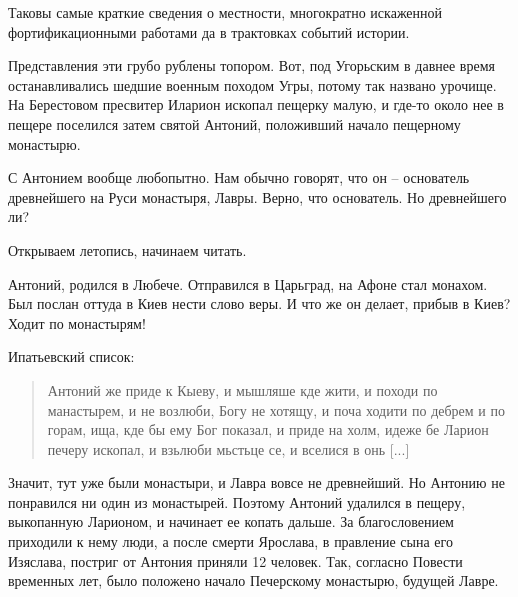 Таковы самые краткие сведения о местности, многократно искаженной фортификационными работами да в трактовках событий истории.

Представления эти грубо рублены топором. Вот, под Угорьским в давнее время останавливались шедшие военным походом Угры, потому так названо урочище. На Берестовом пресвитер Иларион ископал пещерку малую, и где-то около нее в пещере поселился затем святой Антоний, положивший начало пещерному монастырю. 

С Антонием вообще любопытно. Нам обычно говорят, что он – основатель древнейшего на Руси монастыря, Лавры. Верно, что основатель. Но древнейшего ли? 

Открываем летопись, начинаем читать.

Антоний, родился в Любече. Отправился в Царьград, на Афоне стал монахом. Был послан оттуда в Киев нести слово веры. И что же он делает, прибыв в Киев? Ходит по монастырям!

Ипатьевский список:

\begin{quotation}
Антоний же приде к Кыеву, и мышляше кде жити, и походи по манастырем, и не возлюби, Богу не хотящу, и поча ходити по дебрем и по горам, ища, кде бы ему Бог показал, и приде на холм, идеже бе Ларион печеру ископал, и взьлюби мьстьце се, и вселися в онь [...]
\end{quotation}

Значит, тут уже были монастыри, и Лавра вовсе не древнейший. Но Антонию не понравился ни один из монастырей. Поэтому Антоний удалился в пещеру, выкопанную Ларионом, и начинает ее копать дальше. За благословением приходили к нему люди, а после смерти Ярослава, в правление сына его Изяслава, постриг от Антония приняли 12 человек. Так, согласно Повести временных лет, было положено начало Печерскому монастырю, будущей Лавре.

